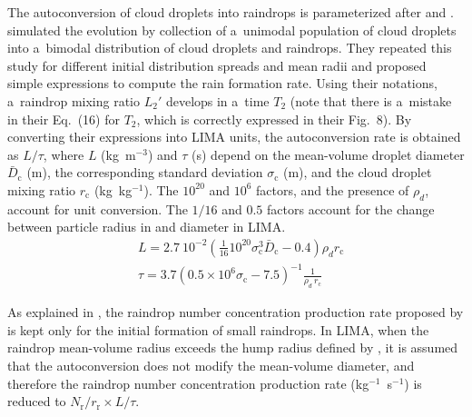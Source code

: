 The autoconversion of cloud droplets into raindrops is parameterized after \citet{Berry1974} and \citet{Cohard2000c2r2} \citep[see also][]{Gilmore2008}. \citet{Berry1974} simulated the evolution by collection of a~unimodal population of cloud droplets into a~bimodal distribution of cloud droplets and raindrops. They repeated this study for different initial distribution spreads and mean radii and proposed simple expressions to compute the rain formation rate. Using their notations, a~raindrop mixing ratio $L_2'$ develops in a~time $T_2$ (note that there is a~mistake in their Eq.~(16) for $T_2$, which is correctly expressed in their Fig.~8). By converting their expressions into LIMA units, the autoconversion rate is obtained as $L/\tau$, where $L$ (kg~m$^{-3}$) and $\tau$ (s) depend on the mean-volume droplet diameter $\bar{D}_{\mathrm{c}}$ (m), the corresponding standard deviation $\sigma_{\mathrm{c}}$ (m), and the cloud droplet mixing ratio $r_{\mathrm{c}}$ (kg~kg$^{-1}$). The $10^{20}$ and $10^{6}$ factors, and the presence of $\rho_d$, account for unit conversion. The $1/16$ and $0.5$ factors account for the change between particle radius in \citet{Berry1974} and diameter in LIMA.
\begin{align}
& L = 2.7~10^{-2} \left( \frac{1}{16} 10^{20} \sigma_{\mathrm{c}}^3 \bar{D}_{\mathrm{c}} - 0.4 \right) \rho_d r_{\mathrm{c}} \\
& \tau = 3.7 \left( 0.5 \times 10^6 \sigma_{\mathrm{c}} - 7.5 \right)^{-1} \frac{1}{\rho_d~r_{\mathrm{c}}}
\end{align}

As explained in \citet{Cohard2000c2r2}, the raindrop number concentration production rate proposed by \citet{Berry1974} is kept only for the initial formation of small raindrops. In LIMA, when the raindrop mean-volume radius exceeds the hump radius defined by \citet{Berry1974}, it is assumed that the autoconversion does not modify the mean-volume diameter, and therefore the raindrop number concentration production rate (kg$^{-1}$~s$^{-1}$) is reduced to ${N_{\mathrm{r}}}/{r_{\mathrm{r}}}\times {L}/{\tau}$.

